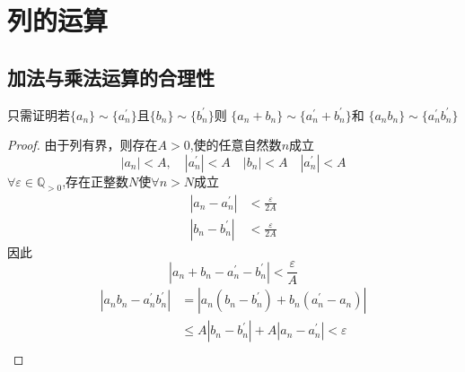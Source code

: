 \documentclass[12pt, a4paper, oneside]{ctexart}
\newcommand{\ep}{\varepsilon}
\begin{document}
\section{列的运算}
\subsection{加法与乘法运算的合理性}
只需证明若$\{a_{n}\}\sim \{a_{n}^{\prime}\}$且$\{b_{n}\}\sim \{b_{n}^{\prime}\}$则 $ \{a_{n}+b_{n}\} \sim \{a_{n}^{\prime}+b_{n}^{\prime}\}$和
$ \{a_{n} b_{n}\}\sim \{a_{n}^{\prime} b_{n}^{\prime}\}$
\begin{proof}
    由于列有界，则存在$A>0$,使的任意自然数$n$成立
    \begin{equation*}
        |a_{n}|<A,\quad |a_{n}^{\prime}|<A\quad |b_{n}|<A\quad |a_{n}^{\prime}|<A
    \end{equation*}
    $\forall \ep \in \mathbb{Q}_{>0}$,存在正整数$N$使$\forall n>N$成立
    \begin{align*}
        |a_{n}-a_{n}^{\prime}| & <\frac{\ep}{2A} \\
        |b_{n}-b_{n}^{\prime}| & <\frac{\ep}{2A}
    \end{align*}
    因此
    \begin{equation*}
        |a_{n}+b_{n}-a_{n}^{\prime}-b_{n}^{\prime}|<\frac{\ep}{A}
    \end{equation*}
    \begin{align*}
        |a_{n}b_{n}-a_{n}^{\prime} b_{n}^{\prime}| & =|a_{n}(b_{n}-b_{n}^{\prime})+b_{n}(a_{n}^{\prime}-a_{n})| \\
                                                   & \le A|b_{n}-b_{n}^{\prime}|+A|a_{n}-a_{n}^{\prime}|<\ep    \\
    \end{align*}

\end{proof}
\end{document}
